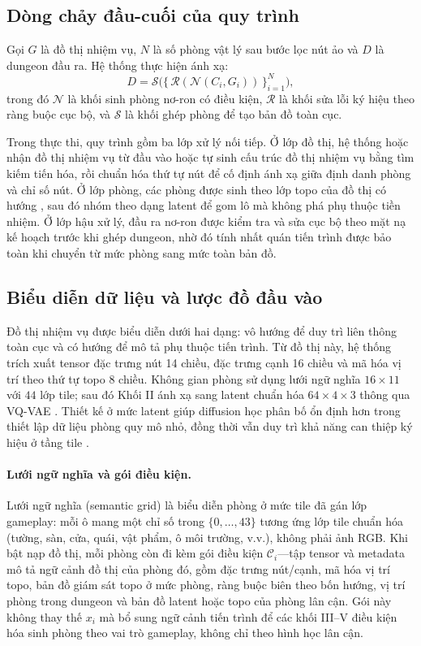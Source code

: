 \documentclass[oneside,a4paper,12pt]{extreport}
\begin{document}
\subsection{Dòng chảy đầu-cuối của quy trình}
Gọi $G$ là đồ thị nhiệm vụ, $N$ là số phòng vật lý sau bước lọc nút ảo và $D$ là dungeon đầu ra. Hệ thống thực hiện ánh xạ:
\begin{equation}
D = \mathcal{S}\Big(\{\,\mathcal{R}(\mathcal{N}(C_i, G_i))\,\}_{i=1}^{N}\Big),
\end{equation}
trong đó $\mathcal{N}$ là khối sinh phòng nơ-ron có điều kiện, $\mathcal{R}$ là khối sửa lỗi ký hiệu theo ràng buộc cục bộ, và $\mathcal{S}$ là khối ghép phòng để tạo bản đồ toàn cục.

Trong thực thi, quy trình gồm ba lớp xử lý nối tiếp. Ở lớp đồ thị, hệ thống hoặc nhận đồ thị nhiệm vụ từ đầu vào hoặc tự sinh cấu trúc đồ thị nhiệm vụ bằng tìm kiếm tiến hóa, rồi chuẩn hóa thứ tự nút để cố định ánh xạ giữa định danh phòng và chỉ số nút. Ở lớp phòng, các phòng được sinh theo lớp topo của đồ thị có hướng \cite{kahn1962topological}, sau đó nhóm theo dạng latent để gom lô mà không phá phụ thuộc tiền nhiệm. Ở lớp hậu xử lý, đầu ra nơ-ron được kiểm tra và sửa cục bộ theo mặt nạ kế hoạch trước khi ghép dungeon, nhờ đó tính nhất quán tiến trình được bảo toàn khi chuyển từ mức phòng sang mức toàn bản đồ.

\subsection{Biểu diễn dữ liệu và lược đồ đầu vào}
Đồ thị nhiệm vụ được biểu diễn dưới hai dạng: vô hướng để duy trì liên thông toàn cục và có hướng để mô tả phụ thuộc tiến trình. Từ đồ thị này, hệ thống trích xuất tensor đặc trưng nút 14 chiều, đặc trưng cạnh 16 chiều và mã hóa vị trí theo thứ tự topo 8 chiều. Không gian phòng sử dụng lưới ngữ nghĩa $16\times 11$ với $44$ lớp tile; sau đó Khối II ánh xạ sang latent chuẩn hóa $64\times 4\times 3$ thông qua VQ-VAE \cite{oord2017vqvae}. Thiết kế ở mức latent giúp diffusion học phân bố ổn định hơn trong thiết lập dữ liệu phòng quy mô nhỏ, đồng thời vẫn duy trì khả năng can thiệp ký hiệu ở tầng tile \cite{rombach2022ldm}.

\paragraph{Lưới ngữ nghĩa và gói điều kiện.}
Lưới ngữ nghĩa (semantic grid) là biểu diễn phòng ở mức tile đã gán lớp gameplay: mỗi ô mang một chỉ số trong $\{0,\ldots,43\}$ tương ứng lớp tile chuẩn hóa (tường, sàn, cửa, quái, vật phẩm, ô môi trường, v.v.), không phải ảnh RGB. Khi bật nạp đồ thị, mỗi phòng còn đi kèm gói điều kiện $\mathcal{C}_i$---tập tensor và metadata mô tả ngữ cảnh đồ thị của phòng đó, gồm đặc trưng nút/cạnh, mã hóa vị trí topo, bản đồ giám sát topo ở mức phòng, ràng buộc biên theo bốn hướng, vị trí phòng trong dungeon và bản đồ latent hoặc topo của phòng lân cận. Gói này không thay thế $x_i$ mà bổ sung ngữ cảnh tiến trình để các khối III--V điều kiện hóa sinh phòng theo vai trò gameplay, không chỉ theo hình học lân cận.
\end{document}
